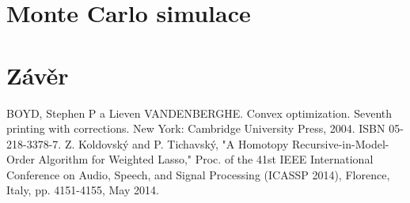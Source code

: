 \documentclass[FM,BP]{tulthesis}
\begin{document}
\chapter{Monte Carlo simulace}

\chapter{Závěr}

\renewcommand{\bibname}{Seznam použité literatury}
\begin{thebibliography}{99}
 BOYD, Stephen P a Lieven VANDENBERGHE. Convex optimization. Seventh printing with corrections. New York: Cambridge University Press, 2004. ISBN 05-218-3378-7.
Z. Koldovský and P. Tichavský, "A Homotopy Recursive-in-Model-Order Algorithm for Weighted Lasso," Proc. of the 41st IEEE International Conference on Audio, Speech, and Signal Processing (ICASSP 2014), Florence, Italy, pp. 4151-4155, May 2014.
\end{thebibliography}
\end{document}
